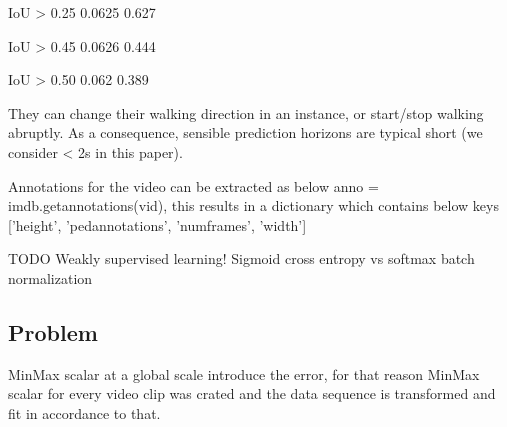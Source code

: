 IoU > 0.25 0.0625 0.627

IoU > 0.45 0.0626 0.444

IoU > 0.50 0.062 0.389

They can change their walking direction in an instance,
or start/stop walking abruptly. As a consequence, sensible prediction horizons
are typical short (we consider < 2s in this paper).



Annotations for the video can be extracted as below
anno = imdb.\textunderscore get\textunderscore annotations(vid), this results in a dictionary which contains below keys ['height', 'ped\textunderscore annotations', 'num\textunderscore frames', 'width']

TODO
\newpara Weakly supervised learning!
Sigmoid cross entropy vs  softmax
batch normalization


\subsection{Problem}
MinMax scalar at a global scale introduce the error, for that reason MinMax scalar for every video clip was crated and the data sequence is transformed and fit in accordance to that.
 
